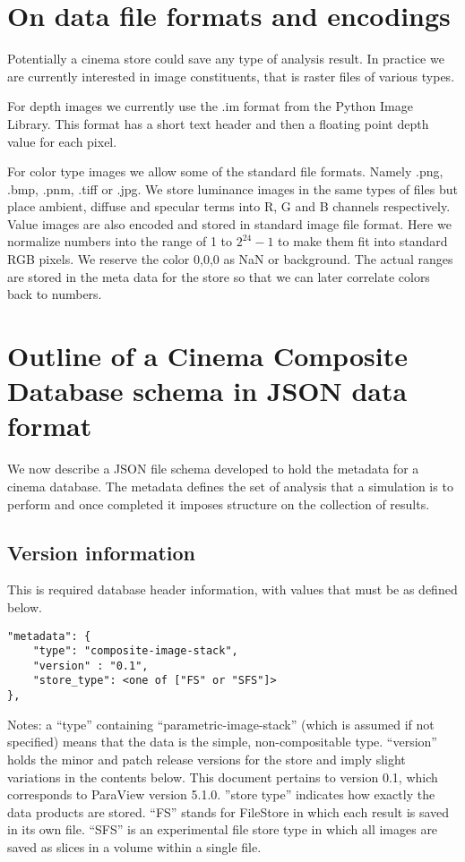 \documentclass{article}
\begin{document}
\section{On data file formats and encodings}
Potentially a cinema store could save any type of analysis result. In practice we are currently interested in image constituents, that is raster files of various types.

For depth images we currently use the .im format from the Python Image Library. This format has a short text header and then a floating point depth value for each pixel.

For color type images we allow some of the standard file formats. Namely .png, .bmp, .pnm, .tiff or .jpg.
We store luminance images in the same types of files but place ambient, diffuse and specular terms into R, G and B channels respectively.
Value images are also encoded and stored in standard image file format. Here we normalize numbers into the range of 1 to $2^{24}-1$ to make them fit into standard RGB pixels. We reserve the color 0,0,0 as NaN or background. The actual ranges are stored in the meta data for the store so that we can later correlate colors back to numbers.

\section{Outline of a Cinema Composite Database schema in JSON data format}
We now describe a JSON file schema developed to hold the metadata for a cinema database. The metadata defines the set of analysis that a simulation is to perform and once completed it imposes structure on the collection of results.

\subsection{Version information}

This is required database header information, with values that must be as defined below.

\begin{verbatim}
"metadata": {
    "type": "composite-image-stack",
    "version" : "0.1",
    "store_type": <one of ["FS" or "SFS"]>
},
\end{verbatim}

Notes: a ``type'' containing ``parametric-image-stack'' (which is assumed if not specified) means that the data is the simple, non-compositable type.
 ``version'' holds the minor and patch release versions for the store and imply slight variations in the contents below. This document pertains to version 0.1, which corresponds to ParaView version 5.1.0.
''store type'' indicates how exactly the data products are stored.
``FS'' stands for FileStore in which each result is saved in its own file. ``SFS'' is an experimental file store type in which all images are saved as slices in a volume within a single file.
\end{document}
